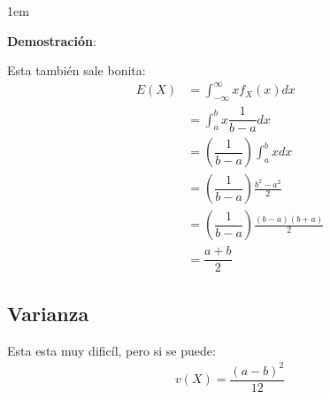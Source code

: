 \documentclass[12pt, fleqn]{report}                             %
\newenvironment{SmallIndentation}[1][0.75em]                    %
        {\begin{adjustwidth}{#1}{}\begin{footnotesize}}             %
        {\end{footnotesize}\end{adjustwidth}}                       %
\theoremstyle{break}                                            %
\newcommand{\Wrap}[1]{\left( #1 \right)}                        %
\newcommand{\pfrac}[2]{\Wrap{\dfrac{#1}{#2}}}                   %
\begin{document}
                \begin{SmallIndentation}[1em]
                    \textbf{Demostración}:
                    
                    Esta también sale bonita:
                    \begin{align*}
                        E(X)
                            &= \int_{-\infty}^\infty x f_X (x) dx           \\
                            &= \int_a^b x \dfrac{1}{b-a} dx                 \\
                            &= \pfrac{1}{b-a} \int_a^b x  dx                \\
                            &= \pfrac{1}{b-a} \frac{b^2 - a^2}{2}           \\
                            &= \pfrac{1}{b-a} \frac{(b-a)(b+a)}{2}          \\
                            &= \dfrac{a+b}{2}
                    \end{align*}
                    
                \end{SmallIndentation}

            \clearpage
            \subsection{Varianza}

                Esta esta muy dificíl, pero si se puede:
                \begin{align*}
                    v(X) = \dfrac{(a-b)^2}{12}
                \end{align*}
\end{document}
